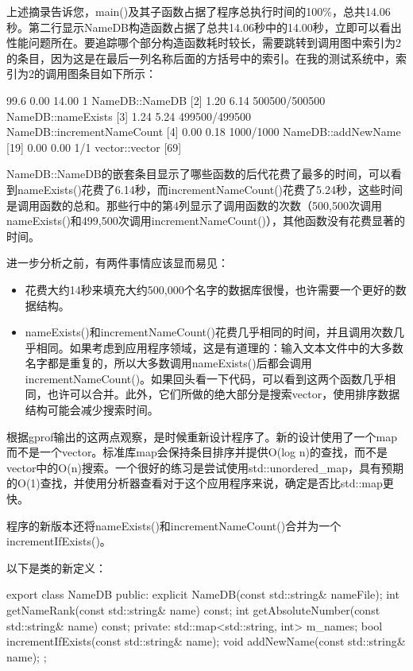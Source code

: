 上述摘录告诉您，main()及其子函数占据了程序总执行时间的100\%，总共14.06秒。第二行显示NameDB构造函数占据了总共14.06秒中的14.00秒，立即可以看出性能问题所在。要追踪哪个部分构造函数耗时较长，需要跳转到调用图中索引为2的条目，因为这是在最后一列名称后面的方括号中的索引。在我的测试系统中，索引为2的调用图条目如下所示：

\begin{shell}
[2] 99.6   0.00   14.00         1            NameDB::NameDB [2]
           1.20    6.14    500500/500500         NameDB::nameExists [3]
           1.24    5.24    499500/499500         NameDB::incrementNameCount [4]
           0.00    0.18      1000/1000           NameDB::addNewName [19]
           0.00    0.00         1/1              vector::vector [69]
\end{shell}

NameDB::NameDB的嵌套条目显示了哪些函数的后代花费了最多的时间，可以看到nameExists()花费了6.14秒，而incrementNameCount()花费了5.24秒，这些时间是调用函数的总和。那些行中的第4列显示了调用函数的次数（500,500次调用nameExists()和499,500次调用incrementNameCount()），其他函数没有花费显著的时间。

进一步分析之前，有两件事情应该显而易见：

\begin{itemize}
\item
花费大约14秒来填充大约500,000个名字的数据库很慢，也许需要一个更好的数据结构。

\item
nameExists()和incrementNameCount()花费几乎相同的时间，并且调用次数几乎相同。如果考虑到应用程序领域，这是有道理的：输入文本文件中的大多数名字都是重复的，所以大多数调用nameExists()后都会调用incrementNameCount()。如果回头看一下代码，可以看到这两个函数几乎相同，也许可以合并。此外，它们所做的绝大部分是搜索vector，使用排序数据结构可能会减少搜索时间。
\end{itemize}


根据gprof输出的这两点观察，是时候重新设计程序了。新的设计使用了一个map而不是一个vector。标准库map会保持条目排序并提供O(log n)的查找，而不是vector中的O(n)搜索。一个很好的练习是尝试使用std::unordered\_map，具有预期的O(1)查找，并使用分析器查看对于这个应用程序来说，确定是否比std::map更快。

程序的新版本还将nameExists()和incrementNameCount()合并为一个incrementIfExists()。

以下是类的新定义：

\begin{cpp}
export class NameDB
{
    public:
        explicit NameDB(const std::string& nameFile);
        int getNameRank(const std::string& name) const;
        int getAbsoluteNumber(const std::string& name) const;
    private:
        std::map<std::string, int> m_names;
        bool incrementIfExists(const std::string& name);
        void addNewName(const std::string& name);
};
\end{cpp}

